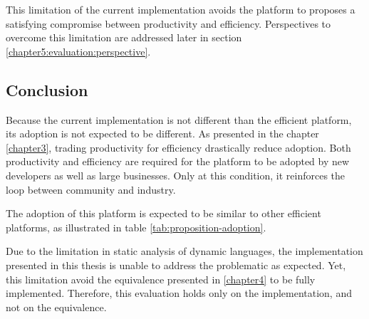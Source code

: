 
This limitation of the current implementation avoids the platform to proposes a satisfying compromise between productivity and efficiency.
Perspectives to overcome this limitation are addressed later in section \ref{chapter5:evaluation:perspective}.



\subsection{Conclusion}

Because the current implementation is not different than the efficient platform, its adoption is not expected to be different.
As presented in the chapter \ref{chapter3}, trading productivity for efficiency drastically reduce adoption.
Both productivity and efficiency are required for the platform to be adopted by new developers as well as large businesses.
Only at this condition, it reinforces the loop between community and industry.

The adoption of this platform is expected to be similar to other efficient platforms, as illustrated in table \ref{tab:proposition-adoption}.



\separator

Due to the limitation in static analysis of dynamic languages, the implementation presented in this thesis is unable to address the problematic as expected.
Yet, this limitation avoid the equivalence presented in \ref{chapter4} to be fully implemented.
Therefore, this evaluation holds only on the implementation, and not on the equivalence.




